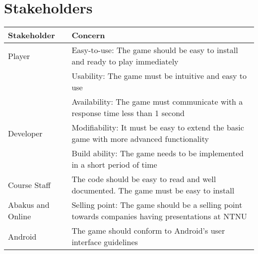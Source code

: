\section{Stakeholders}
\label{sec:stakeholders}
\begin{tabular}{|m{}|m{}|}
\hline
Stakeholder & Concern \\ \hline
Player & Easy-to-use: The game should be easy to install and ready to play
immediately \\
& Usability: The game must be intuitive and easy to use \\
& Availability: The game must communicate with a response time less than 1
second \\ \hline
Developer & Modifiability: It must be easy to extend the basic game with more
advanced functionality\\
& Build ability: The game needs to be implemented in a short period of time\\
\hline
Course Staff & The code should be easy to read and well documented. The game
must be easy to install \\ \hline
Abakus and Online & Selling point: The game should be a selling point towards
companies having presentations at NTNU\\ \hline
Android & The game should conform to Android's user interface
guidelines\cite{website:android} \\ \hline
\end{tabular}
